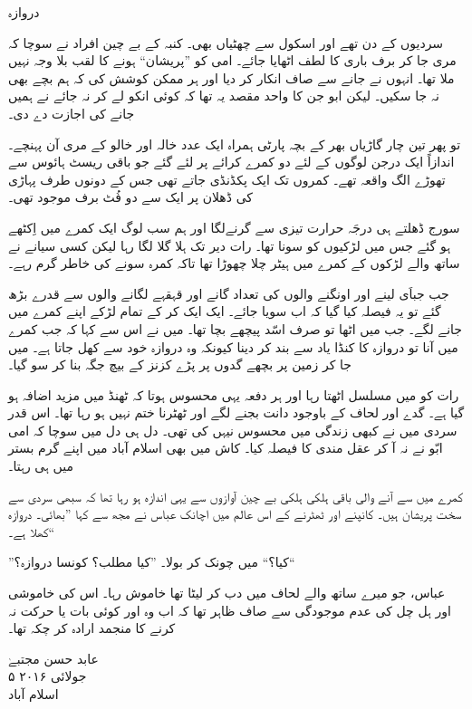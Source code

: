 \documentclass{article}
\begin{document}
\begin{center} \Large
   دروازہ
\end{center}

سردیوں کے دن تھے اور اسکول سے چھٹیاں بھی۔ کنبہ کے بے چین افراد نے سوچا کہ مری جا کر برف باری کا لطف اٹھایا جائے۔ امی کو ''پریشان`` ہونے کا لقب بلا وجہ نہیں ملا تھا۔ انہوں نے جانے سے صاف انکار کر دیا اور ہر ممکن کوشش کی کہ ہم بچے بھی نہ جا سکیں۔ لیکن ابو جن کا واحد مقصد یہ تھا کہ کوئی انکو لے کر نہ جائے نے ہمیں جانے کی اجازت دے دی۔

تو پھر تین چار گاڑیاں بھر کے بچہ پارٹی ہمراہ ایک عدد خالہ اور خالو کے مری آن پہنچے۔ اندازاً ایک درجن لوگوں کے لئے دو کمرے کرائے پر لئے گئے جو باقی ریسٹ ہائوس سے تھوڑے الگ واقعہ تھے۔ کمروں تک ایک پکڈنڈی جاتے تھی جس کے دونوں طرف پہاڑی کی ڈھلان پر ایک سے دو فُٹ برف موجود تھی۔

سورج ڈھلتے ہی درجَہ حرارت تیزی سے گرنےلگا اور ہم سب لوگ ایک کمرے میں اِکٹھے ہو گئے جس میں لڑکیوں کو سونا تھا۔ رات دیر تک ہلا گلا لگا رہا لیکن کسی سیانے نے ساتھ والے لڑکوں کے کمرے میں ہیٹر چلا چھوڑا تھا تاکہ کمرہ سونے کی خاطر گرم رہے۔

جب جباَی لینے اور اونگنے والوں کی تعداد گانے اور قہقہے لگانے والوں سے قدرے بڑھ گئے تو یہ فیصلہ کیا گیا کہ اب سویا جائے۔ ایک ایک کر کے تمام لڑکے اپنے کمرے میں جانے لگے۔ جب میں اٹھا تو صرف اسّد پیچھے بچا تھا۔ میں نے اس سے کہا کہ جب کمرے میں آنا تو دروازہ کا کنڈا یاد سے بند کر دینا کیونکہ وہ دروازہ خود سے کھل جاتا ہے۔ میں جا کر زمین پر بچھے گدوں پر پڑے کزنز کے بیچ جگہ بنا کر سو گیا۔

رات کو میں مسلسل اٹھتا رہا اور ہر دفعہ یہی محسوس ہوتا کہ ٹھنڈ میں مزید اضافہ ہو گیا ہے۔ گدے اور لحاف کے باوجود دانت بجنے لگے اور ٹھٹرنا ختم نہیں ہو رہا تھا۔ اس قدر سردی میں نے کبھی زندگی میں محسوس نیہں کی تھی۔ دل ہی دل میں سوچا کہ امی ابّو نے نہ آ کر عقل مندی کا فیصلہ کیا۔ کاش میں بھی اسلام آباد میں اپنے گرم بستر میں ہی رہتا۔

کمرے میں سے آنے والی باقی ہلکی ہلکی بے چین آوازوں سے یہی اندازہ ہو رہا تھا کہ سبھی سردی سے سخت پریشان ہیں۔ کانپنے اور ٹھٹرنے کے اس عالم میں اچانک عباس نے مجھ سے کہا ''بھائی۔ دروازہ کھلا ہے۔``

''کیا؟`` میں چونک کر بولا۔ ''کیا مطلب؟ کونسا دروازہ؟``

عباس، جو میرے ساتھ والے لحاف میں دب کر لیٹا تھا خاموش رہا۔ اس کی خاموشی اور ہل چل کی عدم موجودگی سے صاف ظاہر تھا کہ اب وہ اور کوئی بات یا حرکت نہ کرنے کا منجمد ارادہ کر چکہ تھا۔

\vspace{\baselineskip}
\begin{flushleft}
   عابد حسن مجتبےٰ\\
   ۵ جولائی ۲۰۱۶\\
   اسلام آباد
\end{flushleft}
\end{document}
